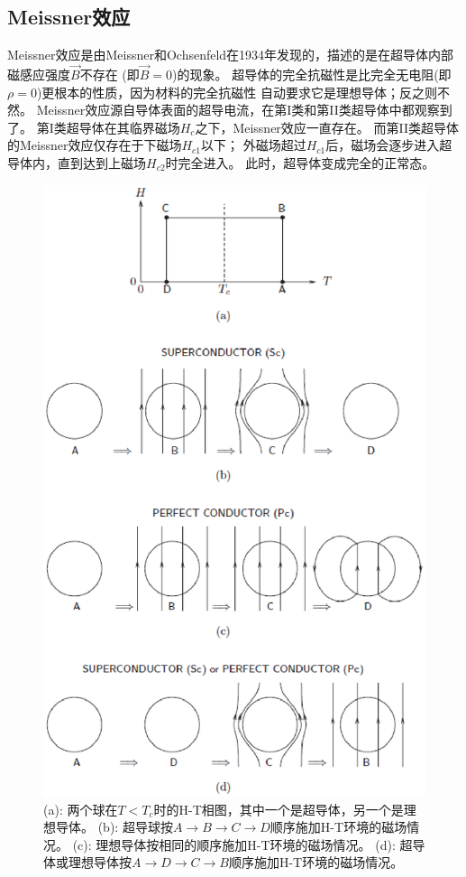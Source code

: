 \subsection{Meissner效应}
Meissner效应是由Meissner和Ochsenfeld在1934年发现的，描述的是在超导体内部磁感应强度$\vec{B}$不存在
(即$\vec{B}=0$)的现象。
超导体的完全抗磁性是比完全无电阻(即$\rho=0$)更根本的性质，因为材料的完全抗磁性
自动要求它是理想导体；反之则不然。
Meissner效应源自导体表面的超导电流，在第I类和第II类超导体中都观察到了。
第I类超导体在其临界磁场$H_c$之下，Meissner效应一直存在。
而第II类超导体的Meissner效应仅存在于下磁场$H_{c1}$以下；
外磁场超过$H_{c1}$后，磁场会逐步进入超导体内，直到达到上磁场$H_{c2}$时完全进入。
此时，超导体变成完全的正常态。
\begin{figure}
  \centering
 \includegraphics[scale=0.7]{chpt1/figs/fig1.1.eps}
  \caption{
(a): 两个球在$T <T_c$时的H-T相图，其中一个是超导体，另一个是理想导体。
(b): 超导球按$ A\rightarrow B\rightarrow C\rightarrow D$顺序施加H-T环境的磁场情况。
(c): 理想导体按相同的顺序施加H-T环境的磁场情况。
(d): 超导体或理想导体按$A\rightarrow D\rightarrow C\rightarrow B$顺序施加H-T环境的磁场情况。}
\end{figure}

